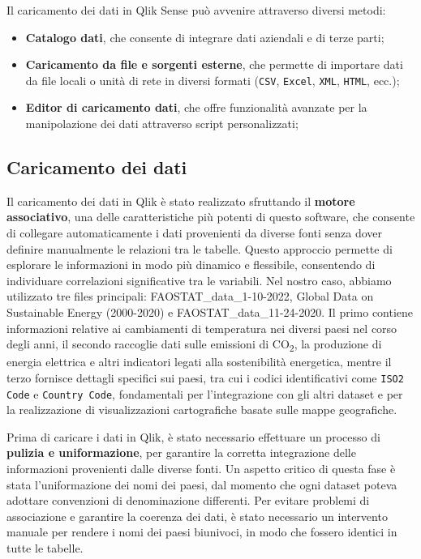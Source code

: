\noindent Il caricamento dei dati in Qlik Sense può avvenire attraverso diversi metodi:

\vspace{2mm}
\begin{itemize}
    \item \textbf{Catalogo dati}, che consente di integrare dati aziendali e di terze parti;
    
    \item \textbf{Caricamento da file e sorgenti esterne}, che permette di importare dati da file locali o unità di rete in diversi formati (\texttt{CSV}, \texttt{Excel}, \texttt{XML}, \texttt{HTML}, ecc.);
    
    \item \textbf{Editor di caricamento dati}, che offre funzionalità avanzate per la manipolazione dei dati attraverso script personalizzati;
\end{itemize}
\vspace{2mm}

\subsection{Caricamento dei dati}

Il caricamento dei dati in Qlik è stato realizzato sfruttando il \textbf{motore associativo}, una delle caratteristiche più potenti di questo software, che consente di collegare automaticamente i dati provenienti da diverse fonti senza dover definire manualmente le relazioni tra le tabelle. Questo approccio permette di esplorare le informazioni in modo più dinamico e flessibile, consentendo di individuare correlazioni significative tra le variabili. Nel nostro caso, abbiamo utilizzato tre files principali: FAOSTAT\_data\_1-10-2022, Global Data on Sustainable Energy (2000-2020) e FAOSTAT\_data\_11-24-2020. Il primo contiene informazioni relative ai cambiamenti di temperatura nei diversi paesi nel corso degli anni, il secondo raccoglie dati sulle emissioni di CO\textsubscript{2}, la produzione di energia elettrica e altri indicatori legati alla sostenibilità energetica, mentre il terzo fornisce dettagli specifici sui paesi, tra cui i codici identificativi come \texttt{ISO2 Code} e \texttt{Country Code}, fondamentali per l’integrazione con gli altri dataset e per la realizzazione di visualizzazioni cartografiche basate sulle mappe geografiche.

Prima di caricare i dati in Qlik, è stato necessario effettuare un processo di \textbf{pulizia e uniformazione}, per garantire la corretta integrazione delle informazioni provenienti dalle diverse fonti. Un aspetto critico di questa fase è stata l’uniformazione dei nomi dei paesi, dal momento che ogni dataset poteva adottare convenzioni di denominazione differenti. Per evitare problemi di associazione e garantire la coerenza dei dati, è stato necessario un intervento manuale per rendere i nomi dei paesi biunivoci, in modo che fossero identici in tutte le tabelle.

